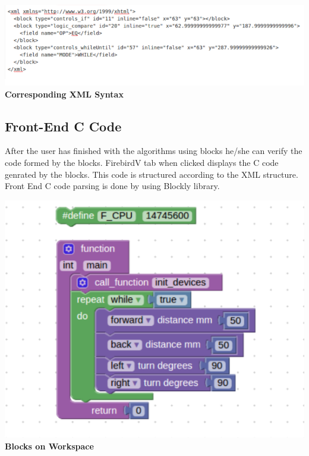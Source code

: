 \documentclass[a4paper,12pt,oneside]{book}
\begin{document}
    \begin{center}
    \includegraphics[scale =0.5]{imag6}\\[.3in]
    \textbf{Corresponding XML Syntax}
    \end{center}
    \newpage
    \subsection{Front-End C Code}
    After the user has finished with the algorithms using blocks he/she can verify the code formed by the blocks.
    FirebirdV tab when clicked displays the C code genrated by the blocks. This code is structured according to the XML structure.
    Front End  C code parsing is done by using Blockly library. \\
    
    \begin{center}
    \includegraphics[scale =0.6]{imag7}\\[.1in]
    \textbf{Blocks on Workspace}\\[1in]
    \end{center}
\end{document}
